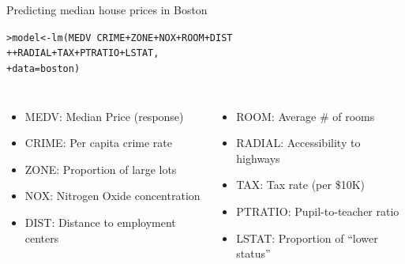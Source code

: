 \documentclass{beamer}\usepackage[]{graphicx}\usepackage[]{color}
\makeatletter
\newcommand{\hlopt}[1]{\textcolor[rgb]{1,0.894,0.769}{#1}}%
\newcommand{\hlstd}[1]{\textcolor[rgb]{1,0.894,0.769}{#1}}%
\newcommand{\hlkwb}[1]{\textcolor[rgb]{0.804,0.776,0.451}{#1}}%
\newcommand{\hlkwc}[1]{\textcolor[rgb]{0.78,0.941,0.545}{#1}}%
\newcommand{\hlkwd}[1]{\textcolor[rgb]{1,0.78,0.769}{#1}}%
\newenvironment{kframe}{%
 \def\at@end@of@kframe{}%
 \ifinner\ifhmode%
  \def\at@end@of@kframe{\end{minipage}}%
  \begin{minipage}{\columnwidth}%
 \fi\fi%
 \def\FrameCommand##1{\hskip\@totalleftmargin \hskip-\fboxsep
 \colorbox{shadecolor}{##1}\hskip-\fboxsep
     \hskip-\linewidth \hskip-\@totalleftmargin \hskip\columnwidth}%
 \MakeFramed {\advance\hsize-\width
   \@totalleftmargin\z@ \linewidth\hsize
   \@setminipage}}%
 {\par\unskip\endMakeFramed%
 \at@end@of@kframe}
\newenvironment{knitrout}{}{} %
\makeatother
\begin{document}
\begin{darkframes}
    \begin{frame}[fragile]{Predicting median house prices in Boston}
\begin{knitrout}
\begin{kframe}
\begin{alltt}
\hlstd{> }\hlstd{model} \hlkwb{<-} \hlkwd{lm}\hlstd{(MEDV} \hlopt{~} \hlstd{CRIME} \hlopt{+} \hlstd{ZONE} \hlopt{+} \hlstd{NOX} \hlopt{+} \hlstd{ROOM} \hlopt{+} \hlstd{DIST}
\hlstd{+ }             \hlopt{+} \hlstd{RADIAL} \hlopt{+} \hlstd{TAX} \hlopt{+} \hlstd{PTRATIO} \hlopt{+} \hlstd{LSTAT,}
\hlstd{+ }             \hlkwc{data}\hlstd{=boston)}
\end{alltt}
\end{kframe}
\end{knitrout}
      \begin{columns}[onlytextwidth]
          \begin{itemize}
            \item MEDV: Median Price (response)
            \item CRIME: Per capita crime rate
            \item ZONE: Proportion of large lots
            \item NOX: Nitrogen Oxide concentration
            \item DIST: Distance to employment centers
          \end{itemize}
          \begin{itemize}
            \item ROOM: Average \# of rooms
            \item RADIAL: Accessibility to highways
            \item TAX: Tax rate (per \$10K)
            \item PTRATIO: Pupil-to-teacher ratio
            \item LSTAT: Proportion of ``lower status''
          \end{itemize}
      \end{columns}
    \end{frame}



\end{darkframes}
\end{document}
